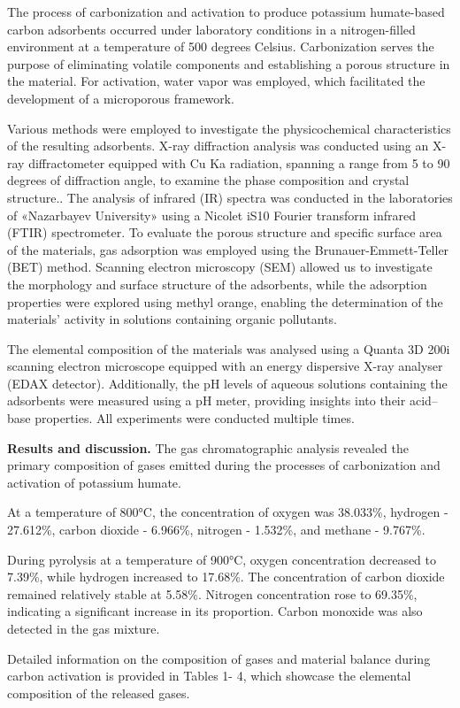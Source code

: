\begin{multicols}{2}
The process of carbonization and activation to produce potassium
humate-based carbon adsorbents occurred under laboratory conditions in a
nitrogen-filled environment at a temperature of 500 degrees Celsius.
Carbonization serves the purpose of eliminating volatile components and
establishing a porous structure in the material. For activation, water
vapor was employed, which facilitated the development of a microporous
framework.

Various methods were employed to investigate the physicochemical
characteristics of the resulting adsorbents. X-ray diffraction analysis
was conducted using an X-ray diffractometer equipped with Cu Ka
radiation, spanning a range from 5 to 90 degrees of diffraction angle,
to examine the phase composition and crystal structure.. The analysis of
infrared (IR) spectra was conducted in the laboratories of «Nazarbayev
University» using a Nicolet iS10 Fourier transform infrared (FTIR)
spectrometer. To evaluate the porous structure and specific surface area
of the materials, gas adsorption was employed using the
Brunauer-Emmett-Teller (BET) method. Scanning electron microscopy (SEM)
allowed us to investigate the morphology and surface structure of the
adsorbents, while the adsorption properties were explored using methyl
orange, enabling the determination of the materials'{}
activity in solutions containing organic pollutants.

The elemental composition of the materials was analysed using a Quanta
3D 200i scanning electron microscope equipped with an energy dispersive
X-ray analyser (EDAX detector). Additionally, the pH levels of aqueous
solutions containing the adsorbents were measured using a pH meter,
providing insights into their acid--base properties. All experiments
were conducted multiple times.

{\bfseries Results and discussion.} The gas chromatographic analysis
revealed the primary composition of gases emitted during the processes
of carbonization and activation of potassium humate.

At a temperature of 800°C, the concentration of oxygen was 38.033\%,
hydrogen - 27.612\%, carbon dioxide - 6.966\%, nitrogen - 1.532\%, and
methane - 9.767\%.

During pyrolysis at a temperature of 900°C, oxygen concentration
decreased to 7.39\%, while hydrogen increased to 17.68\%. The
concentration of carbon dioxide remained relatively stable at 5.58\%.
Nitrogen concentration rose to 69.35\%, indicating a significant
increase in its proportion. Carbon monoxide was also detected in the gas
mixture.

Detailed information on the composition of gases and material balance
during carbon activation is provided in Tables 1- 4, which showcase the
elemental composition of the released gases.
\end{multicols}

